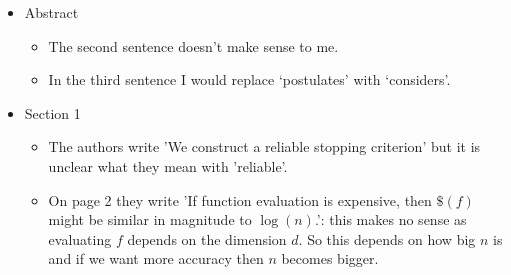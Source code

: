 \documentclass{amsart}
\begin{document}
\begin{itemize}
\item Abstract
\begin{itemize}
\item The second sentence doesn't make sense to me. 
\item In the third sentence I would replace `postulates' with `considers'.  
\end{itemize}

\item Section 1
\begin{itemize}
\item The authors write 'We construct a reliable stopping criterion' but it is
unclear what they mean with 'reliable'. 
\item On page 2 they write 'If function evaluation is expensive, then $\$(f)$ might be similar in magnitude to $\log(n)$.': this makes no sense as evaluating $f$
depends on the dimension $d$. So this depends on how big $n$ is and if we want more
accuracy then $n$ becomes bigger. 
\end{itemize}


\end{itemize}
\end{document}
